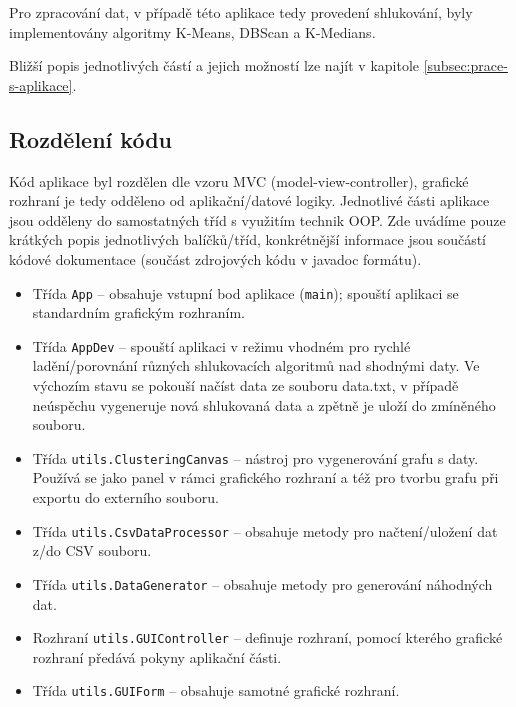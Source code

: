 \documentclass[pdftex,a4paper]{article}
\begin{document}
Pro zpracování dat, v případě této aplikace tedy provedení shlukování, byly implementovány algoritmy K-Means, DBScan a K-Medians.

Bližší popis jednotlivých částí a jejich možností lze najít v kapitole \ref{subsec:prace-s-aplikace}.



\subsection{Rozdělení kódu}
Kód aplikace byl rozdělen dle vzoru MVC (model-view-controller), grafické rozhraní je tedy odděleno od aplikační/datové logiky. Jednotlivé části aplikace jsou odděleny do samostatných tříd s využitím technik OOP. Zde uvádíme pouze krátkých popis jednotlivých balíčků/tříd, konkrétnější informace jsou součástí kódové dokumentace (součást zdrojových kódu v javadoc formátu).

\begin{itemize}
	\item Třída \texttt{App} -- obsahuje vstupní bod aplikace (\texttt{main}); spouští aplikaci se standardním grafickým rozhraním.
	
	\item Třída \texttt{AppDev} -- spouští aplikaci v režimu vhodném pro rychlé ladění/porovnání různých shlukovacích algoritmů nad shodnými daty. Ve výchozím stavu se pokouší načíst data ze souboru data.txt, v případě neúspěchu vygeneruje nová shlukovaná data a zpětně je uloží do zmíněného souboru.
\end{itemize}

\medskip

\begin{itemize}
	\item Třída \texttt{utils.ClusteringCanvas} -- nástroj pro vygenerování grafu s daty. Používá se jako panel v rámci grafického rozhraní a též pro tvorbu grafu při exportu do externího souboru.
	
	\item Třída \texttt{utils.CsvDataProcessor} -- obsahuje metody pro načtení/uložení dat z/do CSV souboru.
	
	\item Třída \texttt{utils.DataGenerator} -- obsahuje metody pro generování náhodných dat.
	
	\item Rozhraní \texttt{utils.GUIController} -- definuje rozhraní, pomocí kterého grafické rozhraní předává pokyny aplikační části.
	
	\item Třída \texttt{utils.GUIForm} -- obsahuje samotné grafické rozhraní.
\end{itemize}
\end{document}
